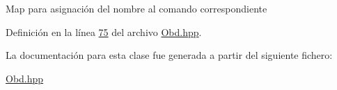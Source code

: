 Map para asignación del nombre al comando correspondiente 

Definición en la línea \hyperlink{Obd_8hpp_source_l00075}{75} del archivo \hyperlink{Obd_8hpp_source}{Obd.\+hpp}.



La documentación para esta clase fue generada a partir del siguiente fichero\+:\begin{DoxyCompactItemize}
\item 
\hyperlink{Obd_8hpp}{Obd.\+hpp}\end{DoxyCompactItemize}
